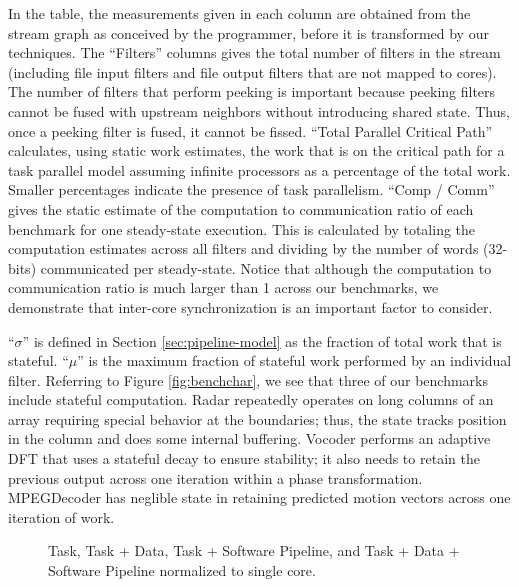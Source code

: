 In the table, the measurements given in each column are obtained from
the stream graph as conceived by the programmer, before it is
transformed by our techniques.  The ``Filters'' columns gives the
total number of filters in the stream (including file input filters
and file output filters that are not mapped to cores).  The number of
filters that perform peeking is important because peeking filters
cannot be fused with upstream neighbors without introducing shared
state.  Thus, once a peeking filter is fused, it cannot be fissed.
``Total Parallel Critical Path'' calculates, using static work
estimates, the work that is on the critical path for a task parallel
model assuming infinite processors as a percentage of the total work.
Smaller percentages indicate the presence of task parallelism.  ``Comp
/ Comm'' gives the static estimate of the computation to communication
ratio of each benchmark for one steady-state execution. This is
calculated by totaling the computation estimates across all filters
and dividing by the number of words (32-bits) communicated per
steady-state. Notice that although the computation to communication
ratio is much larger than 1 across our benchmarks, we demonstrate that
inter-core synchronization is an important factor to consider.

``$\sigma$'' is defined in Section \ref{sec:pipeline-model} as the
fraction of total work that is stateful.  ``$\mu$'' is the maximum
fraction of stateful work performed by an individual filter. Referring
to Figure \ref{fig:benchchar}, we see that three of our benchmarks
include stateful computation.  Radar repeatedly operates on long
columns of an array requiring special behavior at the boundaries;
thus, the state tracks position in the column and does some internal
buffering.  Vocoder performs an adaptive DFT that uses a stateful
decay to ensure stability; it also needs to retain the previous output
across one iteration within a phase transformation.  MPEGDecoder has
neglible state in retaining predicted motion vectors across one
iteration of work.

\begin{figure*}[t]
\centering
{}
\caption{Task, Task + Data, Task + Software Pipeline, and Task + Data + Software Pipeline
normalized to single core.
\protect\label{fig:main_comp}}
\vspace{-6pt}
\end{figure*}

